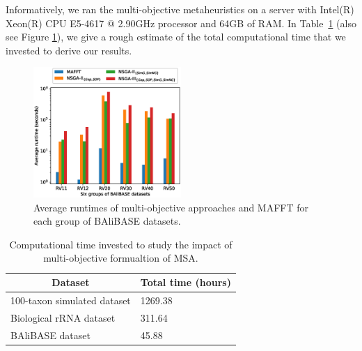 Informatively, we ran the multi-objective metaheuristics on a server with Intel(R) Xeon(R) CPU E5-4617 @ 2.90GHz processor and 64GB of RAM. In Table~\ref{tab:time} (also see Figure \ref{fig:runtime_comp}), we give a rough estimate of the total computational time that we invested to derive our results.



\begin{figure}[!htbp] 
	\centering
	\includegraphics[width=0.5\textwidth]{Figure/balibase_runtime_comparison}
	\caption{Average runtimes of multi-objective approaches and MAFFT for each group of BAliBASE datasets.} 
	\label{fig:runtime_comp}
\end{figure}


\begin{table}[htbp]
	\small
	\centering
	\caption{Computational time invested to study the impact of multi-objective formualtion of MSA.}
	\begin{tabular}{|l|l|}
		\hline 
		\multicolumn{1}{|c|}{Dataset} & \multicolumn{1}{c|}{Total time (hours)} \\ 
		\hline 
		100-taxon simulated dataset &  1269.38\\ 
		\hline 
		Biological rRNA dataset &  311.64\\ 
		\hline 
		BAliBASE dataset &  45.88\\ 
		\hline 
	\end{tabular} 
	\label{tab:time}%
\end{table}%


